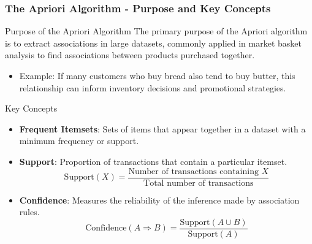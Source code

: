 \documentclass{beamer}
\begin{document}
\begin{frame}[fragile]
    \frametitle{The Apriori Algorithm - Purpose and Key Concepts}
    \begin{block}{Purpose of the Apriori Algorithm}
        The primary purpose of the Apriori algorithm is to extract associations in large datasets, commonly applied in market basket analysis to find associations between products purchased together.
    \end{block}
    
    \begin{itemize}
        \item Example: If many customers who buy bread also tend to buy butter, this relationship can inform inventory decisions and promotional strategies.
    \end{itemize}
    
    \begin{block}{Key Concepts}
        \begin{itemize}
            \item \textbf{Frequent Itemsets}: Sets of items that appear together in a dataset with a minimum frequency or support.
            \item \textbf{Support}: Proportion of transactions that contain a particular itemset.
            \begin{equation}
                \text{Support}(X) = \frac{\text{Number of transactions containing } X}{\text{Total number of transactions}}
            \end{equation}
            \item \textbf{Confidence}: Measures the reliability of the inference made by association rules.
            \begin{equation}
                \text{Confidence}(A \Rightarrow B) = \frac{\text{Support}(A \cup B)}{\text{Support}(A)}
            \end{equation}
        \end{itemize}
    \end{block}
\end{frame}
\end{document}
